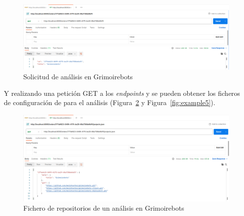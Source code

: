 \begin{figure}[ht]
    \centering
    \includegraphics[width=\textwidth]{Figures/example3}
    \decoRule
    \caption[Grimoirebots (Solicitud de análisis)]{Solicitud de análisis en Grimoirebots}
    \label{fig:example3}
\end{figure}

Y realizando una petición GET a los \emph{endpoints}  y  se pueden obtener los ficheros de configuración de  para el análisis (Figura~\ref{fig:example4} y Figura~\ref{fig:example5}).

\begin{figure}[ht]
    \centering
    \includegraphics[width=\textwidth]{Figures/example4}
    \decoRule
    \caption[Análisis en Grimoirebots (Fichero de repositorios)]{Fichero de repositorios de un análisis en Grimoirebots}
    \label{fig:example4}
\end{figure}

